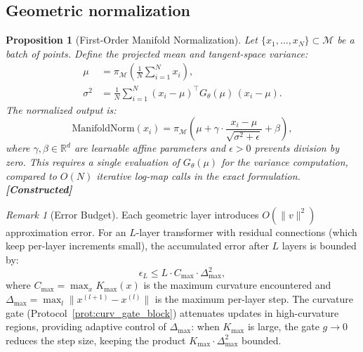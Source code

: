 \documentclass[11pt,a4paper]{article}
\newtheorem{proposition}[theorem]{Proposition}
\theoremstyle{definition}
\theoremstyle{remark}
\newtheorem{remark}[theorem]{Remark}
\newcommand{\R}{\mathbb{R}}
\newcommand{\statusconstructed}{\textcolor{blue!70!black}{\textbf{[Constructed]}}}
\begin{document}
\subsection{Geometric normalization}\label{sec:geo_norm}

\begin{proposition}[First-Order Manifold Normalization]%
\label{prop:manifold_norm}
Let $\{x_1, \ldots, x_N\} \subset \mathcal{M}$ be a batch of 
points. Define the projected mean and tangent-space variance:
\begin{align}
  \mu &= \pi_{\mathcal{M}}\!\left(\frac{1}{N}\sum_{i=1}^N 
  x_i\right), \label{eq:projected_mean} \\
  \sigma^2 &= \frac{1}{N}\sum_{i=1}^N 
  (x_i - \mu)^\top G_\theta(\mu)\, (x_i - \mu).
  \label{eq:riemannian_var}
\end{align}
The normalized output is:
\begin{equation}\label{eq:manifold_norm_output}
    \mathrm{ManifoldNorm}(x_i) = 
    \pi_{\mathcal{M}}\!\left(\mu + \gamma \cdot 
    \frac{x_i - \mu}{\sqrt{\sigma^2 + \epsilon}} 
    + \beta\right),
\end{equation}
where $\gamma, \beta \in \R^d$ are learnable affine parameters 
and $\epsilon > 0$ prevents division by zero. This requires a 
single evaluation of $G_\theta(\mu)$ for the variance 
computation, compared to $O(N)$ iterative log-map calls in the 
exact formulation.
\statusconstructed
\end{proposition}

\begin{remark}[Error Budget]\label{rem:error_budget}
Each geometric layer introduces $O(\|v\|^2)$ approximation 
error. For an $L$-layer transformer with residual connections 
(which keep per-layer increments small), the accumulated error 
after $L$ layers is bounded by:
\begin{equation}\label{eq:error_accum}
    \epsilon_L \leq L \cdot C_{\max} \cdot \Delta_{\max}^2,
\end{equation}
where $C_{\max} = \max_x K_{\max}(x)$ is the maximum curvature 
encountered and $\Delta_{\max} = \max_l \|x^{(l+1)} - x^{(l)}\|$ 
is the maximum per-layer step. The curvature gate 
(Protocol~\ref{prot:curv_gate_block}) attenuates updates in 
high-curvature regions, providing adaptive control of 
$\Delta_{\max}$: when $K_{\max}$ is large, the gate $g \to 0$ 
reduces the step size, keeping the product 
$K_{\max} \cdot \Delta_{\max}^2$ bounded.
\end{remark}
\end{document}
